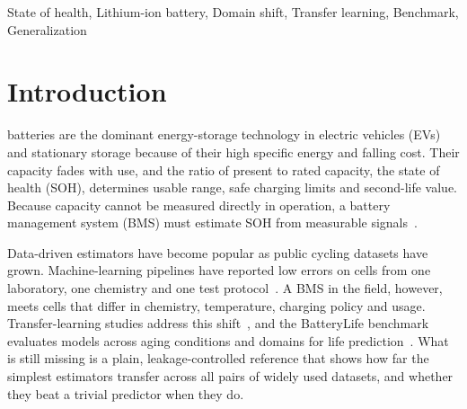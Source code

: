 \documentclass[journal]{IEEEtran}
\begin{document}
\begin{IEEEkeywords}
State of health, Lithium-ion battery, Domain shift, Transfer learning, Benchmark, Generalization
\end{IEEEkeywords}

\section{Introduction}
 batteries are the dominant energy-storage technology in electric vehicles (EVs) and stationary storage because of their high specific energy and falling cost. Their capacity fades with use, and the ratio of present to rated capacity, the state of health (SOH), determines usable range, safe charging limits and second-life value. Because capacity cannot be measured directly in operation, a battery management system (BMS) must estimate SOH from measurable signals~\cite{berecibar2016critical,hu2020battery,li2019datadriven}.

Data-driven estimators have become popular as public cycling datasets have grown. Machine-learning pipelines have reported low errors on cells from one laboratory, one chemistry and one test protocol~\cite{severson2019,roman2021,ng2020,zhang2020impedance}. A BMS in the field, however, meets cells that differ in chemistry, temperature, charging policy and usage. Transfer-learning studies address this shift~\cite{tan2020transfer,shen2020deep,ren2023novel,wang2024pinn}, and the BatteryLife benchmark evaluates models across aging conditions and domains for life prediction~\cite{tan2025batterylife}. What is still missing is a plain, leakage-controlled reference that shows how far the simplest estimators transfer across all pairs of widely used datasets, and whether they beat a trivial predictor when they do.
\end{document}
